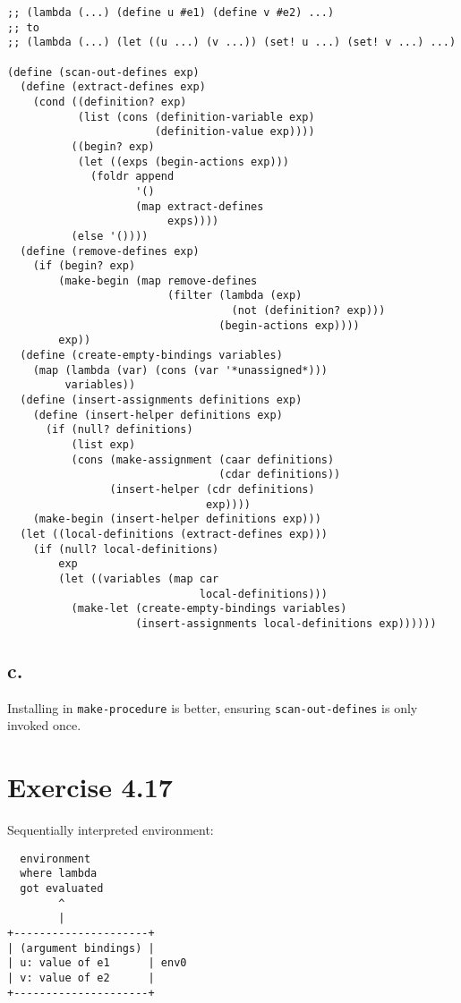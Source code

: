 \documentclass[../main.tex]{subfiles}
\begin{document}
\begin{lstlisting}
;; (lambda (...) (define u #e1) (define v #e2) ...)
;; to
;; (lambda (...) (let ((u ...) (v ...)) (set! u ...) (set! v ...) ...)

(define (scan-out-defines exp)
  (define (extract-defines exp)
    (cond ((definition? exp)
           (list (cons (definition-variable exp)
                       (definition-value exp))))
          ((begin? exp)
           (let ((exps (begin-actions exp)))
             (foldr append
                    '()
                    (map extract-defines
                         exps))))
          (else '())))
  (define (remove-defines exp)
    (if (begin? exp)
        (make-begin (map remove-defines
                         (filter (lambda (exp)
                                   (not (definition? exp)))
                                 (begin-actions exp))))
        exp))
  (define (create-empty-bindings variables)
    (map (lambda (var) (cons (var '*unassigned*)))
         variables))
  (define (insert-assignments definitions exp)
    (define (insert-helper definitions exp)
      (if (null? definitions)
          (list exp)
          (cons (make-assignment (caar definitions)
                                 (cdar definitions))
                (insert-helper (cdr definitions)
                               exp))))
    (make-begin (insert-helper definitions exp)))
  (let ((local-definitions (extract-defines exp)))
    (if (null? local-definitions)
        exp
        (let ((variables (map car
                              local-definitions)))
          (make-let (create-empty-bindings variables)
                    (insert-assignments local-definitions exp))))))
\end{lstlisting}

\subsection{c.}

Installing in \lstinline{make-procedure} is better, ensuring \lstinline{scan-out-defines} is only invoked once.

\section{Exercise 4.17}

Sequentially interpreted environment:

\begin{lstlisting}
  environment
  where lambda
  got evaluated
        ^
        |
+---------------------+
| (argument bindings) |
| u: value of e1      | env0
| v: value of e2      |
+---------------------+
\end{lstlisting}
\end{document}

